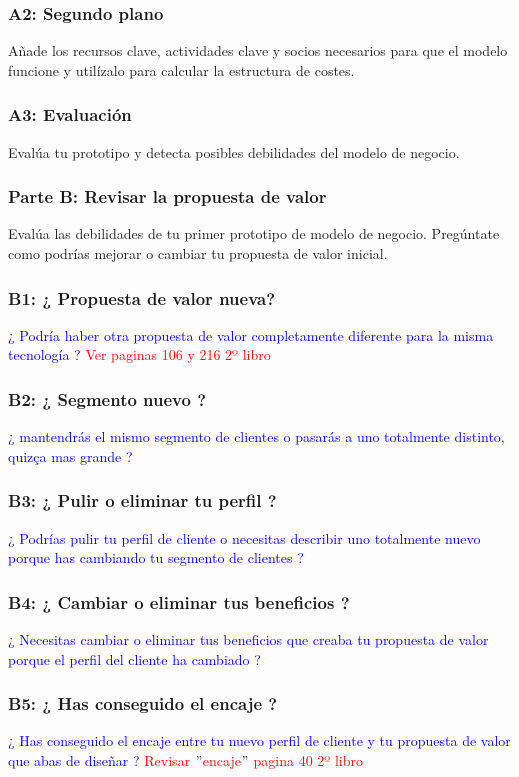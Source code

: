 \documentclass[11pt]{book}
\begin{document}
\subsubsection{A2: Segundo plano}
Añade los recursos clave, actividades clave y socios necesarios para que el modelo funcione y utilízalo para calcular la estructura de costes.
\subsubsection{A3: Evaluación}
Evalúa tu prototipo y detecta posibles debilidades del modelo de negocio.
\subsubsection{Parte B: Revisar la propuesta de valor}
Evalúa las debilidades de tu primer prototipo de modelo de negocio. Pregúntate como podrías mejorar o cambiar tu propuesta de valor inicial.
\subsubsection{B1: ¿ Propuesta de valor nueva?}
\textcolor{blue}{ ¿ Podría haber otra propuesta de valor completamente diferente para la misma tecnología ? }
\textcolor{red}{Ver paginas 106 y 216 2º libro}
\subsubsection{B2: ¿ Segmento nuevo ?}
\textcolor{blue}{¿ mantendrás el mismo segmento de clientes o pasarás a uno totalmente distinto, quizça mas grande ?}
\subsubsection{B3: ¿ Pulir o eliminar tu perfil ?}
\textcolor{blue}{¿ Podrías pulir tu perfil de cliente o necesitas describir uno totalmente nuevo porque has cambiando tu segmento de clientes ?}
\subsubsection{B4: ¿ Cambiar o eliminar tus beneficios ?}
\textcolor{blue}{¿ Necesitas cambiar o eliminar tus beneficios que creaba tu propuesta de valor porque el perfil del cliente ha cambiado ?}
\subsubsection{B5: ¿ Has conseguido el encaje ?}
\textcolor{blue}{¿ Has conseguido el encaje entre tu nuevo perfil de cliente y tu propuesta de valor que abas de diseñar ?}
\textcolor{red}{Revisar  $"$encaje$"$ pagina 40 2º libro}
\end{document}
